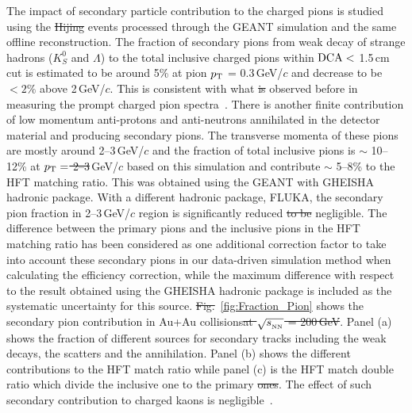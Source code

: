 \documentclass[%
 reprint,	
 amsmath,amssymb,
 aps,
 prc,
]{revtex4-1}
\providecommand{\DIFaddtex}[1]{{\protect\color{blue}\uwave{#1}}} %
\providecommand{\DIFdeltex}[1]{{\protect\color{red}\sout{#1}}}                      %
\providecommand{\DIFaddbegin}{} %
\providecommand{\DIFaddend}{} %
\providecommand{\DIFdelbegin}{} %
\providecommand{\DIFdelend}{} %
\providecommand{\DIFadd}[1]{\texorpdfstring{\DIFaddtex{#1}}{#1}} %
\providecommand{\DIFdel}[1]{\texorpdfstring{\DIFdeltex{#1}}{}} %
\begin{document}
The impact of secondary particle contribution to the charged pions is studied using the \DIFdelbegin \DIFdel{Hijing }\DIFdelend \DIFaddbegin \DIFadd{HIJING }\DIFaddend events processed through the GEANT simulation and the same offline reconstruction. The fraction of secondary pions from weak decay of strange hadrons ($K^0_S$ and $\Lambda$) to the total inclusive charged pions within ${\rm DCA}<$ 1.5\,cm cut is estimated to be around 5\% at pion \DIFdelbegin \DIFdel{$p_{\rm T}$ }\DIFdelend \DIFaddbegin \DIFadd{$p_{T}$ }\DIFaddend = 0.3\,GeV/$c$ and decrease to be $<2\%$ above 2\,GeV/$c$. This is consistent with what \DIFdelbegin \DIFdel{is }\DIFdelend \DIFaddbegin \DIFadd{was }\DIFaddend observed before in measuring the prompt charged pion spectra~\cite{Adams:2003xp}. There is another finite contribution of low momentum anti-protons and anti-neutrons annihilated in the detector material and producing secondary pions. The transverse momenta of these pions are mostly around 2--3\,GeV/$c$ and the fraction of total inclusive pions is $\sim$ 10--12\% at \DIFdelbegin \DIFdel{$p_{\rm T}=$ 2--3}\DIFdelend \DIFaddbegin \DIFadd{$p_{T} =2\textup{-}3$}\DIFaddend \,GeV/$c$ based on this simulation and contribute $\sim$ 5--8\% to the HFT matching ratio. This was obtained using the GEANT with GHEISHA hadronic package. With a different hadronic package, FLUKA, the secondary pion fraction in 2--3\,GeV/$c$ region is significantly reduced \DIFdelbegin \DIFdel{to be }\DIFdelend \DIFaddbegin \DIFadd{and is }\DIFaddend negligible. The difference between the primary pions and the inclusive pions in the HFT matching ratio has been considered as one additional correction factor to take into account these secondary pions in our data-driven simulation method when calculating the efficiency correction, while the maximum difference with respect to the result obtained using the GHEISHA hadronic package is included as the systematic uncertainty for this source. \DIFdelbegin \DIFdel{Fig.}\DIFdelend \DIFaddbegin \DIFadd{Figure}\DIFaddend ~\ref{fig:Fraction_Pion} shows the secondary pion contribution in Au+Au collisions\DIFdelbegin \DIFdel{at $\sqrt{s_{_{\rm NN}}}$ = 200\,GeV}\DIFdelend . Panel (a) shows the fraction of different sources for secondary tracks including the weak decays, the scatters and the \DIFaddbegin \DIFadd{$\bar{p}/\bar{n}$ }\DIFaddend annihilation. Panel (b) shows the different contributions to the HFT match ratio while panel (c) is the HFT match double ratio which divide the inclusive one to the primary \DIFdelbegin \DIFdel{ones}\DIFdelend \DIFaddbegin \DIFadd{one from panel (b)}\DIFaddend . The effect of such secondary contribution to charged kaons is negligible~\cite{Adams:2003xp}.
\end{document}
